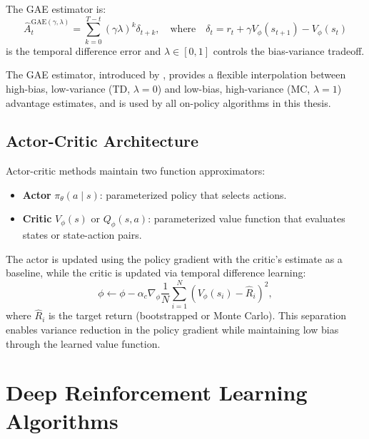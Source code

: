 \begin{definition}
The GAE estimator is:
\begin{equation}
    \hat{A}_t^{\text{GAE}(\gamma, \lambda)} = \sum_{k=0}^{T-t} (\gamma \lambda)^k \delta_{t+k}, \quad \text{where} \quad \delta_t = r_t + \gamma V_\phi(s_{t+1}) - V_\phi(s_t)
    \label{eq:gae}
\end{equation}
is the temporal difference error and $\lambda \in [0, 1]$ controls the bias-variance tradeoff.
\end{definition}

The GAE estimator, introduced by \citet{schulman2016gae}, provides a flexible interpolation between high-bias, low-variance (TD, $\lambda = 0$) and low-bias, high-variance (MC, $\lambda = 1$) advantage estimates, and is used by all on-policy algorithms in this thesis.

\subsection{Actor-Critic Architecture}

Actor-critic methods maintain two function approximators:

\begin{itemize}
    \item \textbf{Actor} $\pi_\theta(a \mid s)$: parameterized policy that selects actions.
    \item \textbf{Critic} $V_\phi(s)$ or $Q_\phi(s, a)$: parameterized value function that evaluates states or state-action pairs.
\end{itemize}

The actor is updated using the policy gradient with the critic's estimate as a baseline, while the critic is updated via temporal difference learning:
\begin{equation}
    \phi \leftarrow \phi - \alpha_c \nabla_\phi \frac{1}{N} \sum_{i=1}^{N} \left(V_\phi(s_i) - \hat{R}_i\right)^2,
    \label{eq:critic_update}
\end{equation}
where $\hat{R}_i$ is the target return (bootstrapped or Monte Carlo). This separation enables variance reduction in the policy gradient while maintaining low bias through the learned value function.

\section{Deep Reinforcement Learning Algorithms}
\label{sec:algorithms}

